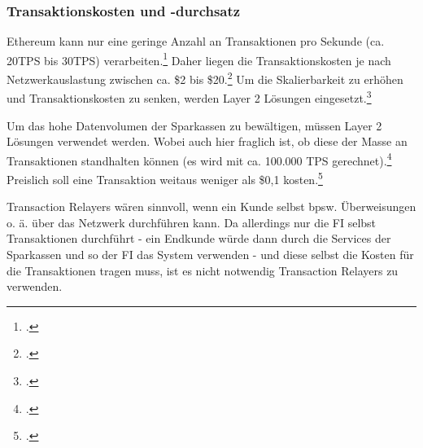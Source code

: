 \subsubsection{Transaktionskosten und -durchsatz}
Ethereum kann nur eine geringe Anzahl an Transaktionen pro Sekunde (ca. 20TPS bis 30TPS)  verarbeiten.\footcite[Vgl.][]{w36}
Daher liegen die Transaktionskosten je nach Netzwerkauslastung zwischen ca. \$2 bis \$20.\footcite[Vgl.][]{w35}
Um die Skalierbarkeit zu erhöhen und Transaktionskosten zu senken, werden Layer 2 Lösungen eingesetzt.\footcite[Vgl.][]{w17}



\bigbreak
\noindent
Um das hohe Datenvolumen der Sparkassen zu bewältigen, müssen Layer 2 Lösungen verwendet werden. 
Wobei auch hier fraglich ist, ob diese der Masse an Transaktionen standhalten können (es wird mit ca. 100.000 TPS gerechnet).\footcite[Vgl.][]{w34}
Preislich soll eine Transaktion weitaus weniger als \$0,1 kosten.\footcite[Vgl.][]{w37}




\bigbreak
\noindent
Transaction Relayers wären sinnvoll, wenn ein Kunde selbst bpsw. Überweisungen o. ä. über das Netzwerk durchführen kann.
Da allerdings nur die FI selbst Transaktionen durchführt - ein Endkunde würde dann durch die Services der Sparkassen und so der FI das System verwenden - und diese selbst die Kosten für die Transaktionen tragen muss, ist es nicht notwendig Transaction Relayers zu verwenden.